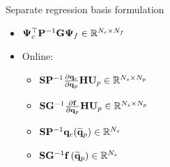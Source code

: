 \documentclass[]{beamer}
\begin{document}
\begin{frame}{Separate regression basis formulation}
\begin{tcolorbox}[colframe=blue!50!white,halign=center]
\begin{minipage}{0.49\linewidth}
\begin{itemize}
\begin{itemize}
				\item $\deimBasisCons^\top \consScaleInv \rhsScale \deimBasisRhs \in \mathbb{R}^{\numConsvModes \times \numRHSModes}$
			\end{itemize}
			\vspace{1.3em}
		\end{itemize}
	\end{minipage}
	\begin{minipage}{0.49\linewidth}
		\begin{itemize}
			\item Online:
			\begin{itemize}
				\item $\sampMat \consScaleInv \pde{\consVec}{\primVec} \primScale \primTrial \in \mathbb{R}^{\numSamps \times \numPrimModes}$
				\item $\sampMat \rhsScaleInv \pde{\rhsVec}{\primVec} \primScale \primTrial \in \mathbb{R}^{\numSamps \times \numPrimModes}$
				\item $\sampMat \consScaleInv \consVec(\primVecRom) \in \mathbb{R}^{\numSamps}$
				\item $\sampMat \rhsScaleInv \rhsFunc{\primVecRom} \in \mathbb{R}^{\numSamps}$
			\end{itemize}
		\end{itemize}
	\end{minipage}
	\end{tcolorbox}
\end{frame}
\end{document}
